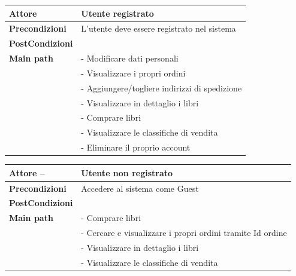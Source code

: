 \documentclass[a4paper,12pt,titlepage]{article}
\begin{document}
	{\renewcommand\arraystretch{1.5}{
	\renewcommand\tabcolsep{0pt}{
	\begin{table}[H]			
			
			\begin{tabular}{p{5cm} p{10cm} }
			\hline
			\textbf{Attore} & \textbf{Utente registrato} \\ \hline
			\textbf{Precondizioni} & L'utente deve essere registrato nel sistema\\ \hline
			\textbf{PostCondizioni}&  \\ \hline
			\textbf{Main path} &  - Modificare dati personali\\ 
			& - Visualizzare i propri ordini\\
			& - Aggiungere/togliere indirizzi di spedizione \\
			& - Visualizzare in dettaglio i libri\\
			& - Comprare libri\\
			& - Visualizzare le classifiche di vendita\\
			& - Eliminare il proprio account \\ \hline
			 \end{tabular}
		\end{table}
	}}
\vspace{0.3cm}
	{\renewcommand\arraystretch{1.5}{
	\renewcommand\tabcolsep{0pt}{
	\begin{table}[H]			
			\begin{tabular}{p{5cm} p{10cm} }
			\hline
			\textbf{Attore} --& \textbf{Utente non registrato} \\ \hline
			\textbf{Precondizioni} & Accedere al sistema come Guest\\ \hline
			\textbf{PostCondizioni} &  \\ \hline
			\textbf{Main path} & - Comprare libri\\
			& - Cercare e visualizzare i propri ordini tramite Id ordine\\
			& - Visualizzare in dettaglio i libri\\
			& - Visualizzare le classifiche di vendita\\ \hline
			 \end{tabular}
		\end{table}
	}}

}}
\end{document}
